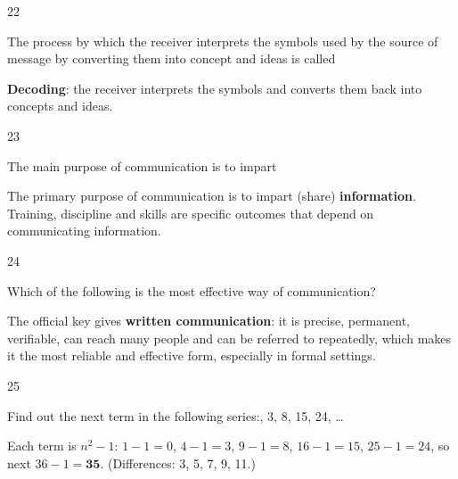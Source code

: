 \begin{question}{22}
{The process by which the receiver interprets the symbols used by the source of message by converting them into concept and ideas is called \blank{}\par}
\begin{explain}
\textbf{Decoding}: the receiver interprets the symbols and converts them back into concepts and ideas.
\end{explain}
\end{question}

\begin{question}{23}
{The main purpose of communication is to impart \blank{}\par}
\begin{explain}
The primary purpose of communication is to impart (share) \textbf{information}. Training, discipline and skills are specific outcomes that depend on communicating information.
\end{explain}
\end{question}

\begin{question}{24}
{Which of the following is the most effective way of communication?\par}
\begin{explain}
The official key gives \textbf{written communication}: it is precise, permanent, verifiable, can reach many people and can be referred to repeatedly, which makes it the most reliable and effective form, especially in formal settings.
\end{explain}
\end{question}

\begin{question}{25}
{Find out the next term in the following series:, 3, 8, 15, 24, \ldots{}\par}
\begin{explain}
Each term is $n^2-1$: $1-1=0$, $4-1=3$, $9-1=8$, $16-1=15$, $25-1=24$, so next $36-1=\mathbf{35}$. (Differences: 3, 5, 7, 9, 11.)
\end{explain}
\end{question}

